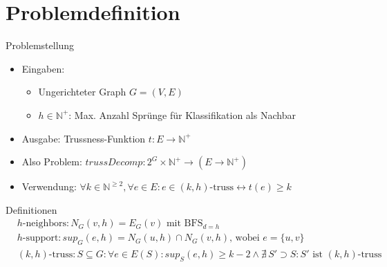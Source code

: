 \section{Problemdefinition}

\begin{frame}{Problemstellung}
    \begin{itemize}
        \item Eingaben:
        \begin{itemize}
            \item Ungerichteter Graph $G = (V,E)$
            \item $h \in \mathbb{N}^+$: Max. Anzahl Sprünge für Klassifikation als Nachbar
        \end{itemize}
        \item Ausgabe: Trussness-Funktion $t: E \rightarrow \mathbb{N}^+$
        \item Also Problem: $trussDecomp: 2^G \times \mathbb{N}^+ \rightarrow (E \rightarrow \mathbb{N}^+)$
        \item Verwendung: $\forall k \in \mathbb{N}^{\geq 2}, \forall e \in E: e \in \text{$(k,h)$-truss} \leftrightarrow t(e) \geq k$
    \end{itemize}
\end{frame}

\begin{frame}{Definitionen}
    \begin{align*}
        &\hspace{0pt} \text{$h$-neighbors}: N_G(v,h) = E_G(v) \text{ mit BFS}_{d=h}  \\
        &\hspace{0pt} \text{$h$-support}: sup_G(e, h) = N_G(u,h) \cap N_G(v,h) \text{, wobei } e = \{u,v\} \\
        &\hspace{0pt} \text{$(k,h)$-truss}: S \subseteq G: \forall e \in E(S): sup_{S}(e,h) \geq k - 2 \land \nexists \, S' \supset S: S' \text{ ist } \text{$(k,h)$-truss} \\
    \end{align*}
\end{frame}
